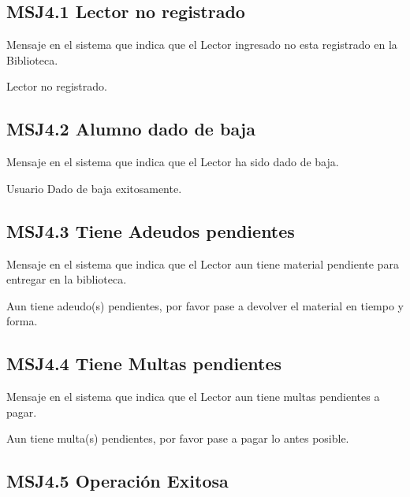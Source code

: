 





\subsection{MSJ4.1 Lector no registrado }

Mensaje en el sistema que indica que el Lector ingresado no esta registrado en la Biblioteca.

  \noindent Lector no registrado.
 
 \subsection{MSJ4.2 Alumno dado de baja }

Mensaje en el sistema que indica que el Lector ha sido dado de baja.

  \noindent Usuario Dado de baja exitosamente.
  
  \subsection{MSJ4.3 Tiene Adeudos pendientes }

Mensaje en el sistema que indica que el Lector aun tiene material pendiente para entregar en la biblioteca.

  \noindent Aun tiene adeudo(s) pendientes, por favor pase a devolver el material en tiempo y forma. 

  \subsection{MSJ4.4 Tiene Multas pendientes }

Mensaje en el sistema que indica que el Lector aun tiene multas pendientes a pagar.

  \noindent Aun tiene multa(s) pendientes, por favor pase a pagar lo antes posible.
  
    \subsection{MSJ4.5 Operación Exitosa }

